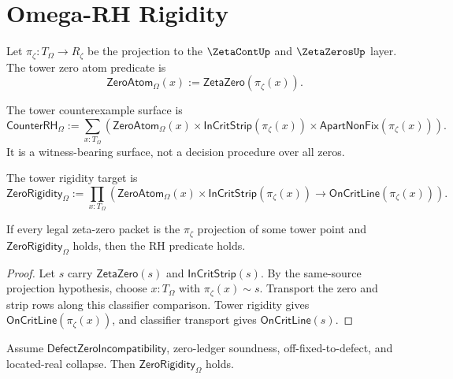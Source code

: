 \section{Omega-RH Rigidity}
\label{sec:mature-bridge-spine-omega-rh}

\begin{definition}
\label{def:mature-bridge-spine-zero-atom}
Let $\pi_{\zeta}:T_{\Omega}\to R_{\zeta}$ be the projection to the
$\ZetaContUp$ and $\ZetaZerosUp$ layer.  The tower zero atom predicate is
$$
\mathsf{ZeroAtom}_{\Omega}(x)
:=
\mathsf{ZetaZero}(\pi_{\zeta}(x)).
$$
\end{definition}

\begin{definition}
\label{def:mature-bridge-spine-counter-rh}
The tower counterexample surface is
$$
\mathsf{CounterRH}_{\Omega}
:=
\sum_{x:T_{\Omega}}
\left(
\mathsf{ZeroAtom}_{\Omega}(x)
\times
\mathsf{InCritStrip}(\pi_{\zeta}(x))
\times
\mathsf{ApartNonFix}(\pi_{\zeta}(x))
\right).
$$
It is a witness-bearing surface, not a decision procedure over all zeros.
\end{definition}

\begin{definition}
\label{def:mature-bridge-spine-zero-rigidity}
The tower rigidity target is
$$
\mathsf{ZeroRigidity}_{\Omega}
:=
\prod_{x:T_{\Omega}}
\left(
\mathsf{ZeroAtom}_{\Omega}(x)
\times
\mathsf{InCritStrip}(\pi_{\zeta}(x))
\to
\mathsf{OnCritLine}(\pi_{\zeta}(x))
\right).
$$
\end{definition}

\begin{theorem}
\label{thm:mature-bridge-spine-rigidity-implies-rh}
If every legal zeta-zero packet is the $\pi_{\zeta}$ projection of some tower
point and $\mathsf{ZeroRigidity}_{\Omega}$ holds, then the RH predicate holds.
\end{theorem}

\begin{proof}
Let $s$ carry $\mathsf{ZetaZero}(s)$ and $\mathsf{InCritStrip}(s)$.  By the
same-source projection hypothesis, choose $x:T_{\Omega}$ with
$\pi_{\zeta}(x)\sim s$.  Transport the zero and strip rows along this
classifier comparison.  Tower rigidity gives
$\mathsf{OnCritLine}(\pi_{\zeta}(x))$, and classifier transport gives
$\mathsf{OnCritLine}(s)$.
\end{proof}

\begin{theorem}
\label{thm:mature-bridge-spine-defect-gives-rigidity}
Assume $\mathsf{DefectZeroIncompatibility}$, zero-ledger soundness,
off-fixed-to-defect, and located-real collapse.  Then
$\mathsf{ZeroRigidity}_{\Omega}$ holds.
\end{theorem}

